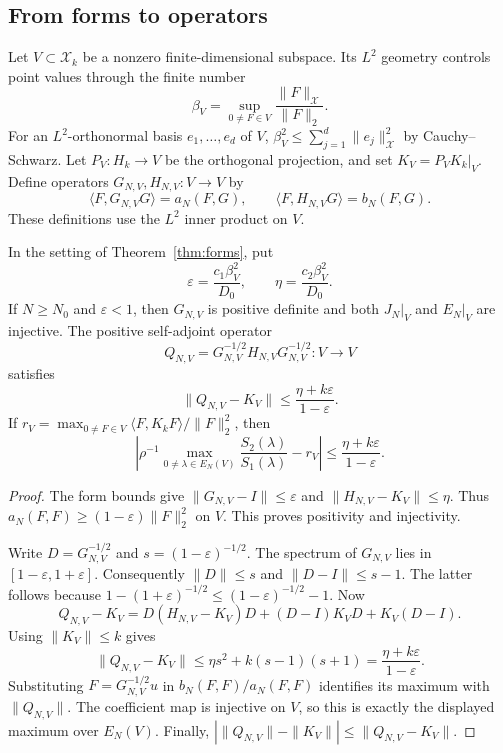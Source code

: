 \documentclass[11pt]{article}
\begin{document}
\subsection{From forms to operators}

Let $V\subset\mathcal X_k$ be a nonzero finite-dimensional subspace.
Its $L^2$ geometry controls point values through the finite number
\[
 \beta_V=\sup_{0\ne F\in V}\frac{\|F\|_{\mathcal X}}{\|F\|_2}.
\]
For an $L^2$-orthonormal basis $e_1,\ldots,e_d$ of $V$,
$\beta_V^2\leq\sum_{j=1}^d\|e_j\|_{\mathcal X}^2$ by Cauchy--Schwarz.
Let $P_V:H_k\to V$ be the orthogonal projection, and set
$K_V=P_VK_k|_V$.  Define operators $G_{N,V},H_{N,V}:V\to V$ by
\[
 \langle F,G_{N,V}G\rangle=a_N(F,G),\qquad
 \langle F,H_{N,V}G\rangle=b_N(F,G).
\]
These definitions use the $L^2$ inner product on $V$.

\begin{theorem}\label{thm:galerkin}
In the setting of Theorem~\ref{thm:forms}, put
\[
 \varepsilon=\frac{c_1\beta_V^2}{D_0},\qquad
 \eta=\frac{c_2\beta_V^2}{D_0}.
\]
If $N\geq N_0$ and $\varepsilon<1$, then $G_{N,V}$ is positive definite
and both $J_N|_V$ and $E_N|_V$ are injective.
The positive self-adjoint operator
\[
 Q_{N,V}=G_{N,V}^{-1/2}H_{N,V}G_{N,V}^{-1/2}:V\to V
\]
satisfies
\begin{equation}\label{eq:spine-bound}
 \|Q_{N,V}-K_V\|
 \leq\frac{\eta+k\varepsilon}{1-\varepsilon}.
\end{equation}
If $r_V=\max_{0\ne F\in V}\langle F,K_kF\rangle/\|F\|_2^2$, then
\[
 \left|\rho^{-1}
       \max_{0\ne\lambda\in E_N(V)}\frac{S_2(\lambda)}{S_1(\lambda)}
        -r_V\right|
 \leq\frac{\eta+k\varepsilon}{1-\varepsilon}.
\]
\end{theorem}

\begin{proof}
The form bounds give
$\|G_{N,V}-I\|\leq\varepsilon$ and
$\|H_{N,V}-K_V\|\leq\eta$.
Thus $a_N(F,F)\geq(1-\varepsilon)\|F\|_2^2$ on $V$.
This proves positivity and injectivity.

Write $D=G_{N,V}^{-1/2}$ and $s=(1-\varepsilon)^{-1/2}$.
The spectrum of $G_{N,V}$ lies in $[1-\varepsilon,1+\varepsilon]$.
Consequently $\|D\|\leq s$ and $\|D-I\|\leq s-1$.
The latter follows because
$1-(1+\varepsilon)^{-1/2}\leq(1-\varepsilon)^{-1/2}-1$.
Now
\[
 Q_{N,V}-K_V=D(H_{N,V}-K_V)D+(D-I)K_VD+K_V(D-I).
\]
Using $\|K_V\|\leq k$ gives
\[
 \|Q_{N,V}-K_V\|
 \leq\eta s^2+k(s-1)(s+1)
 =\frac{\eta+k\varepsilon}{1-\varepsilon}.
\]
Substituting $F=G_{N,V}^{-1/2}u$ in $b_N(F,F)/a_N(F,F)$
identifies its maximum with $\|Q_{N,V}\|$.
The coefficient map is injective on $V$, so this is exactly the displayed
maximum over $E_N(V)$.  Finally,
$|\|Q_{N,V}\|-\|K_V\||\leq\|Q_{N,V}-K_V\|$.
\end{proof}
\end{document}
